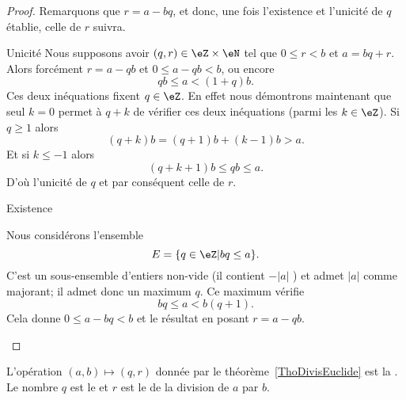 \begin{proof}
    Remarquons que \( r = a - bq \), et donc, une fois l'existence et l'unicité de $q$ établie, celle de $r$ suivra.

    \begin{subproof}
        \item[Unicité]
            Nous supposons avoir \( (q,r)\in \eZ\times \eN\) tel que \( 0\leq r<b\) et \( a=bq+r\). Alors forcément \( r=a-qb\) et $0\leq a-qb<b$, ou encore
            \begin{equation}
                qb\leq a<(1+q)b.
            \end{equation}
            Ces deux inéquations fixent \( q\in \eZ\). En effet nous démontrons maintenant que seul \( k=0\) permet à \( q+k\) de vérifier ces deux inéquations (parmi les \( k\in \eZ\)). Si \( q\geq 1\) alors
            \begin{equation}
                (q+k)b=(q+1)b+(k-1)b>a.
            \end{equation}
            Et si \( k\leq -1\) alors
            \begin{equation}
                (q+k+1)b\leq qb\leq a.
            \end{equation}
            D'où l'unicité de \( q\) et par conséquent celle de \( r\).

        \item[Existence]

            Nous considérons l'ensemble
    \begin{equation*}
        E = \{ q \in \eZ  | bq \leq a \}.
    \end{equation*}
     C'est un sous-ensemble d'entiers non-vide (il contient \( -|a| \) ) et admet \( |a| \) comme majorant; il admet donc un maximum $q$. Ce maximum vérifie
     \begin{equation}
         bq\leq a<b(q+1).
     \end{equation}
     Cela donne \( 0\leq a-bq<b\) et le résultat en posant \( r=a-qb\).

    \end{subproof}

\end{proof}

\begin{definition}
    L'opération \( (a,b)\mapsto(q,r)\) donnée par le théorème~\ref{ThoDivisEuclide} est la . Le nombre \( q\) est le  et \( r\) est le  de la division de \( a\) par \( b\).
\end{definition}


